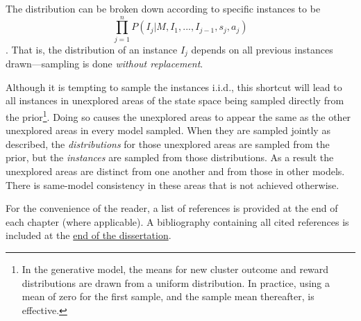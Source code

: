 The distribution can be broken down according to specific instances to be $$\prod_{j=1}^n P(I_j|M,I_1,...,I_{j-1},s_j,a_j)$$. That is, the distribution of an instance $I_j$ depends on all previous instances drawn---sampling is done \emph{without replacement}.

Although it is tempting to sample the instances i.i.d., this shortcut will lead to all instances in unexplored areas of the state space being sampled directly from the prior\footnote{In the generative model, the means for new cluster outcome and reward distributions are drawn from a uniform distribution. In practice, using a mean of zero for the first sample, and the sample mean thereafter, is effective.}. Doing so causes the unexplored areas to appear the same as the other unexplored areas in every model sampled. When they are sampled jointly as described, the \emph{distributions} for those unexplored areas are sampled from the prior, but the \emph{instances} are sampled from those distributions. As a result the unexplored areas are distinct from one another and from those in other models. There is same-model consistency in these areas that is not achieved otherwise.

%
\ifperchapterbib%
For the convenience of the reader, a list of references is provided at the end of each chapter (where applicable).
\ifendbib%
A bibliography containing all cited references is included at the \hyperref[sec:bibliography]{end of the dissertation}.
\else\fi%
\cbend%
\else\fi%